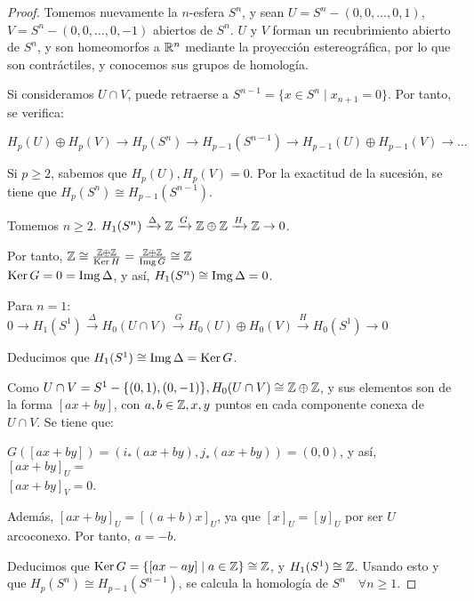 \begin{proof}
  Tomemos nuevamente la $n$-esfera $S^n$, y sean $U = S^n - (0, 0, \dots, 0, 1)$, $V = S^n - (0, 0, \dots, 0, -1)$
  abiertos de $S^n$. $U$ y $V$ forman un recubrimiento abierto de $S^n$, y son homeomorfos a $\mathbb{R}^n$ mediante
  la proyección estereográfica, por lo que son contráctiles, y conocemos sus grupos de homología.

  Si consideramos $U \cap V$, puede retraerse a $S^{n-1} = \{x \in S^n \mid x_{n+1} = 0\}$. Por tanto, se verifica:

  $H_p(U) \oplus H_p(V) \to H_p(S^n) \to H_{p-1}(S^{n-1}) \to H_{p-1}(U) \oplus H_{p-1}(V) \to \dots$

  Si $p \geq 2$, sabemos que $H_p(U), H_p(V) = 0$. Por la exactitud de la sucesión, se tiene que $H_p(S^n) \cong H_{p-1}(S^{n-1})$.

  Tomemos $n \geq 2$. $H_1(S^n) \xrightarrow{\Delta} \mathbb{Z} \xrightarrow{G} \mathbb{Z} \oplus \mathbb{Z} \xrightarrow{H} \mathbb{Z} \to 0$.

  Por tanto, $\mathbb{Z} \cong \frac{\mathbb{Z} \oplus \mathbb{Z}}{\operatorname{Ker} H} = \frac{\mathbb{Z} \oplus \mathbb{Z}}{\operatorname{Img} G} \cong \mathbb{Z}$ \\
  $\operatorname{Ker} G = 0 = \operatorname{Img} \Delta$, y así, $H_1(S^n) \cong \operatorname{Img} \Delta = 0$.

  Para $n = 1$: \\
  $0 \to H_1(S^1) \xrightarrow{\Delta} H_0(U \cap V) \xrightarrow{G} H_0(U) \oplus H_0(V) \xrightarrow{H} H_0(S^1) \to 0$

  Deducimos que $H_1(S^1) \cong \operatorname{Img} \Delta = \operatorname{Ker} G$.

  Como $U \cap V = S^1 - \{(0, 1), (0, -1)\}, H_0(U \cap V) \cong \mathbb{Z} \oplus \mathbb{Z}$, y sus elementos son de la forma
  $[ax + by]$, con $a,b \in \mathbb{Z}, x, y$ puntos en cada componente conexa de $U \cap V$. Se tiene que:

  $G([ax + by]) = (i_*(ax + by), j_*(ax + by)) = (0, 0)$, y así, $[ax + by]_U =$ \\
  $[ax + by]_V = 0$.

  Además, $[ax + by]_U = [(a+b) x]_U$, ya que $[x]_U = [y]_U$ por ser $U$ arcoconexo. Por tanto, $a = -b$.

  Deducimos que $\operatorname{Ker} G = \{[ax - ay] \mid a \in \mathbb{Z}\} \cong \mathbb{Z}$, y $H_1(S^1) \cong \mathbb{Z}$. Usando esto y que
  $H_p(S^n) \cong H_{p-1}(S^{n-1})$, se calcula la homología de $S^n \quad \forall n \geq 1$.
\end{proof}
